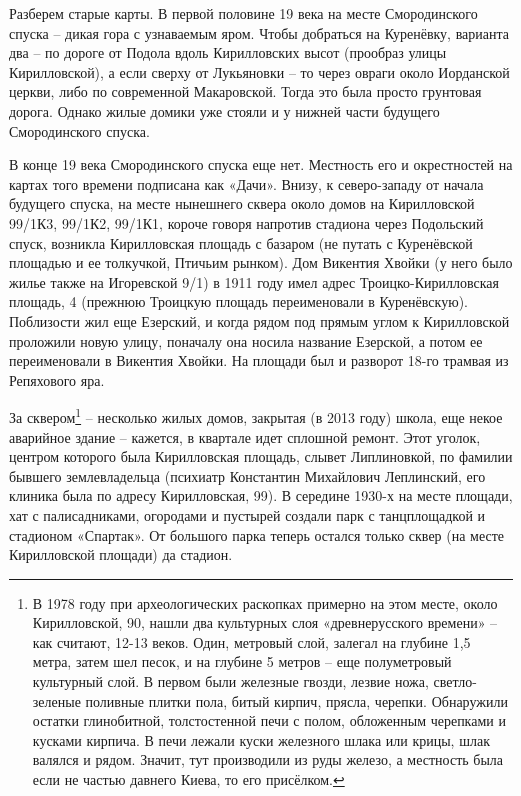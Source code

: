 Разберем старые карты. В первой половине 19 века на месте Смородинского спуска – дикая гора с узнаваемым яром. Чтобы добраться на Куренёвку, варианта два – по дороге от Подола вдоль Кирилловских высот (прообраз улицы Кирилловской), а если сверху от Лукьяновки – то через овраги около Иорданской церкви, либо по современной Макаровской. Тогда это была просто грунтовая дорога. Однако жилые домики уже стояли и у нижней части будущего Смородинского спуска.

В конце 19 века Смородинского спуска еще нет. Местность его и окрестностей на картах того времени подписана как «Дачи». Внизу, к северо-западу от начала будущего спуска, на месте нынешнего сквера около домов на Кирилловской 99/1К3, 99/1К2, 99/1К1, короче говоря напротив стадиона через Подольский спуск, возникла Кирилловская площадь с базаром (не путать с Куренёвской площадью и ее толкучкой, Птичьим рынком). Дом Викентия Хвойки (у него было жилье также на Игоревской 9/1) в 1911 году имел адрес Троицко-Кирилл\-овская площадь, 4 (прежнюю Троицкую площадь переименовали в Куренёвскую). Поблизости жил еще Езерский, и когда рядом под прямым углом к Кирилловской проложили новую улицу, поначалу она носила название Езерской, а потом ее переименовали в Викентия Хвойки. На площади был и разворот 18-го трамвая из Репяхового яра.

За сквером\footnote{В 1978 году при археологических раскопках примерно на этом месте, около Кирилловской, 90, нашли два культурных слоя «древнерусского времени» – как считают, 12-13 веков. Один, метровый слой, залегал на глубине 1,5 метра, затем шел песок, и на глубине 5 метров – еще полуметровый культурный слой. В первом были железные гвозди, лезвие ножа, светло-зеленые поливные плитки пола, битый кирпич, прясла, черепки. Обнаружили остатки глинобитной, толстостенной печи с полом, обложенным черепками и кусками кирпича. В печи лежали куски железного шлака или крицы, шлак валялся и рядом. Значит, тут производили из руды железо, а местность была если не частью давнего Киева, то его присёлком.} – несколько жилых домов, закрытая (в 2013 году) школа, еще некое аварийное здание – кажется, в квартале идет сплошной ремонт. Этот уголок, центром которого была Кирилловская площадь, слывет Липлиновкой, по фамилии бывшего землевладельца (психиатр Константин Михайлович Леплинский, его клиника была по адресу Кирилловская, 99). В середине 1930-х на месте площади, хат с палисадниками, огородами и пустырей создали парк с танцплощадкой и стадионом «Спартак». От большого парка теперь остался только сквер (на месте Кирилловской площади) да стадион. 

